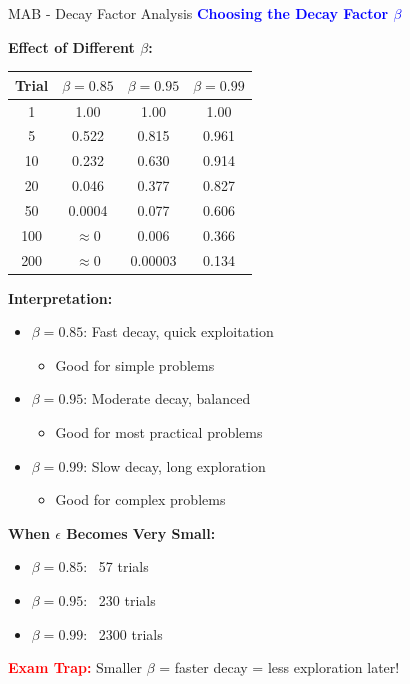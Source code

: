\documentclass[8pt]{beamer}
\begin{document}
	\begin{frame}{MAB - Decay Factor Analysis}
		\fontsize{6.5}{7.5}\selectfont
		\textcolor{blue}{\textbf{Choosing the Decay Factor $\beta$}}
		
		\textbf{Effect of Different $\beta$:}
		
		\begin{tabular}{|c|c|c|c|}
			\hline
			Trial & $\beta=0.85$ & $\beta=0.95$ & $\beta=0.99$ \\
			\hline
			1 & 1.00 & 1.00 & 1.00 \\
			\hline
			5 & 0.522 & 0.815 & 0.961 \\
			\hline
			10 & 0.232 & 0.630 & 0.914 \\
			\hline
			20 & 0.046 & 0.377 & 0.827 \\
			\hline
			50 & 0.0004 & 0.077 & 0.606 \\
			\hline
			100 & $\approx$0 & 0.006 & 0.366 \\
			\hline
			200 & $\approx$0 & 0.00003 & 0.134 \\
			\hline
		\end{tabular}
		
		\textbf{Interpretation:}
		\begin{itemize}
			\item $\beta = 0.85$: Fast decay, quick exploitation
			\begin{itemize}
				\item Good for simple problems
			\end{itemize}
			\item $\beta = 0.95$: Moderate decay, balanced
			\begin{itemize}
				\item Good for most practical problems
			\end{itemize}
			\item $\beta = 0.99$: Slow decay, long exploration
			\begin{itemize}
				\item Good for complex problems
			\end{itemize}
		\end{itemize}
		
		\textbf{When $\epsilon$ Becomes Very Small:}
		\begin{itemize}
			\item $\beta=0.85$: ~57 trials
			\item $\beta=0.95$: ~230 trials
			\item $\beta=0.99$: ~2300 trials
		\end{itemize}
		
		\textcolor{red}{\textbf{Exam Trap:}} Smaller $\beta$ = faster decay = less exploration later!
	\end{frame}
	
\end{document}
